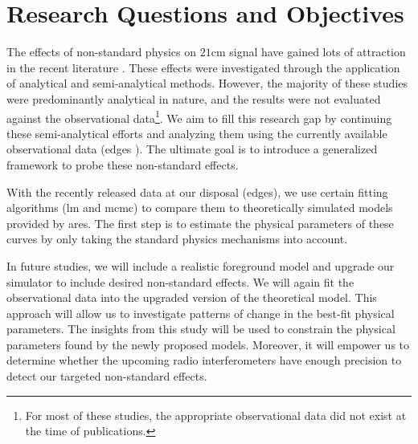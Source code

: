 \documentclass[12pt, TexShade, letterpaper]{report}
\begin{document}
\section{Research Questions and Objectives}
The effects of non-standard physics on $\mathrm{21cm}$ signal have gained lots of attraction in the recent literature \cite{WF_effect_oscar, constrain_dm_21, bh_cosmioc_dawn, cosmic_string_oscar}. These effects were investigated through the application of analytical and semi-analytical methods. However, the majority of these studies were predominantly analytical in nature, and the results were not evaluated against the observational data\footnote{For most of these studies, the appropriate observational data did not exist at the time of publications.}. We aim to fill this research gap by continuing these semi-analytical efforts and analyzing them using the currently available observational data (\gls{edges} \cite{edges}). The ultimate goal is to introduce a generalized framework to probe these non-standard effects.\par
With the recently released data at our disposal (\gls{edges}\cite{edges}), we use certain fitting algorithms (\gls{lm} and \gls{mcmc}) to compare them to theoretically simulated models provided by \gls{ares}\cite{ares2014jordan}. 
The first step is to estimate the physical parameters of these curves by only taking the standard physics mechanisms into account.\par
In future studies, we will include a realistic foreground model and upgrade our simulator to include desired non-standard effects. We will again fit the observational data into the upgraded version of the theoretical model. This approach will allow us to investigate patterns of change in the best-fit physical parameters. The insights from this study will be used to constrain the physical parameters found by the newly proposed models. Moreover, it will empower us to determine whether the upcoming radio interferometers have enough precision to detect our targeted non-standard effects.\par
\end{document}
